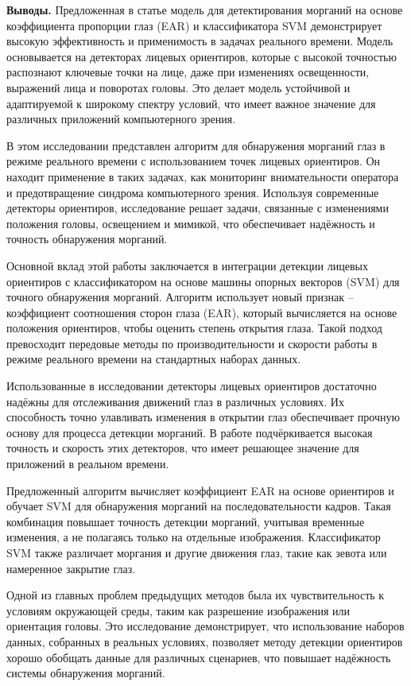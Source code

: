 \begin{multicols}{2}
{\bfseries Выводы.} Предложенная в статье модель для детектирования
морганий на основе коэффициента пропорции глаз (EAR) и классификатора
SVM демонстрирует высокую эффективность и применимость в задачах
реального времени. Модель основывается на детекторах лицевых ориентиров,
которые с высокой точностью распознают ключевые точки на лице, даже при
изменениях освещенности, выражений лица и поворотах головы. Это делает
модель устойчивой и адаптируемой к широкому спектру условий, что имеет
важное значение для различных приложений компьютерного зрения.

В этом исследовании представлен алгоритм для обнаружения морганий глаз в
режиме реального времени с использованием точек лицевых ориентиров. Он
находит применение в таких задачах, как мониторинг внимательности
оператора и предотвращение синдрома компьютерного зрения. Используя
современные детекторы ориентиров, исследование решает задачи, связанные
с изменениями положения головы, освещением и мимикой, что обеспечивает
надёжность и точность обнаружения морганий.

Основной вклад этой работы заключается в интеграции детекции лицевых
ориентиров с классификатором на основе машины опорных векторов (SVM) для
точного обнаружения морганий. Алгоритм использует новый признак --
коэффициент соотношения сторон глаза (EAR), который вычисляется на
основе положения ориентиров, чтобы оценить степень открытия глаза. Такой
подход превосходит передовые методы по производительности и скорости
работы в режиме реального времени на стандартных наборах данных.

Использованные в исследовании детекторы лицевых ориентиров достаточно
надёжны для отслеживания движений глаз в различных условиях. Их
способность точно улавливать изменения в открытии глаз обеспечивает
прочную основу для процесса детекции морганий. В работе подчёркивается
высокая точность и скорость этих детекторов, что имеет решающее значение
для приложений в реальном времени.

Предложенный алгоритм вычисляет коэффициент EAR на основе ориентиров и
обучает SVM для обнаружения морганий на последовательности кадров. Такая
комбинация повышает точность детекции морганий, учитывая временные
изменения, а не полагаясь только на отдельные изображения. Классификатор
SVM также различает моргания и другие движения глаз, такие как зевота
или намеренное закрытие глаз.

Одной из главных проблем предыдущих методов была их чувствительность к
условиям окружающей среды, таким как разрешение изображения или
ориентация головы. Это исследование демонстрирует, что использование
наборов данных, собранных в реальных условиях, позволяет методу детекции
ориентиров хорошо обобщать данные для различных сценариев, что повышает
надёжность системы обнаружения морганий.


\end{multicols}
